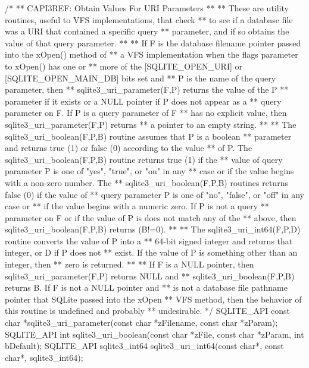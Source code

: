 \begin{Codex}[label=sqlite3.h,numbers=left]
{/*
** CAPI3REF: Obtain Values For URI Parameters
**
** These are utility routines, useful to VFS implementations, that check
** to see if a database file was a URI that contained a specific query 
** parameter, and if so obtains the value of that query parameter.
**
** If F is the database filename pointer passed into the xOpen() method of 
** a VFS implementation when the flags parameter to xOpen() has one or 
** more of the [SQLITE_OPEN_URI] or [SQLITE_OPEN_MAIN_DB] bits set and
** P is the name of the query parameter, then
** sqlite3_uri_parameter(F,P) returns the value of the P
** parameter if it exists or a NULL pointer if P does not appear as a 
** query parameter on F.  If P is a query parameter of F
** has no explicit value, then sqlite3_uri_parameter(F,P) returns
** a pointer to an empty string.
**
** The sqlite3_uri_boolean(F,P,B) routine assumes that P is a boolean
** parameter and returns true (1) or false (0) according to the value
** of P.  The sqlite3_uri_boolean(F,P,B) routine returns true (1) if the
** value of query parameter P is one of "yes", "true", or "on" in any
** case or if the value begins with a non-zero number.  The 
** sqlite3_uri_boolean(F,P,B) routines returns false (0) if the value of
** query parameter P is one of "no", "false", or "off" in any case or
** if the value begins with a numeric zero.  If P is not a query
** parameter on F or if the value of P is does not match any of the
** above, then sqlite3_uri_boolean(F,P,B) returns (B!=0).
**
** The sqlite3_uri_int64(F,P,D) routine converts the value of P into a
** 64-bit signed integer and returns that integer, or D if P does not
** exist.  If the value of P is something other than an integer, then
** zero is returned.
** 
** If F is a NULL pointer, then sqlite3_uri_parameter(F,P) returns NULL and
** sqlite3_uri_boolean(F,P,B) returns B.  If F is not a NULL pointer and
** is not a database file pathname pointer that SQLite passed into the xOpen
** VFS method, then the behavior of this routine is undefined and probably
** undesirable.
*/
SQLITE_API const char *sqlite3_uri_parameter(const char *zFilename, const char *zParam);
SQLITE_API int sqlite3_uri_boolean(const char *zFile, const char *zParam, int bDefault);
SQLITE_API sqlite3_int64 sqlite3_uri_int64(const char*, const char*, sqlite3_int64);


}
\end{Codex}
